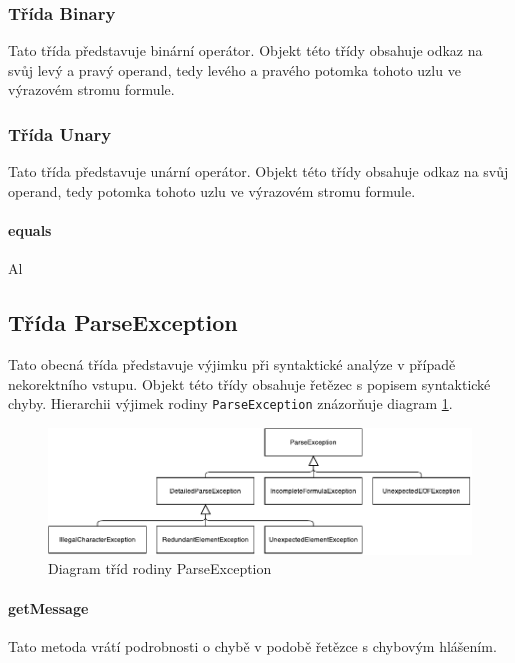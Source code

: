 \documentclass[thesis=B,czech,hidelinks]{thesis}[2012/06/26]
\begin{document}
\subsubsection{Třída Binary}

Tato třída představuje binární operátor. Objekt této třídy obsahuje odkaz na svůj levý a pravý operand, tedy levého a pravého potomka tohoto uzlu ve výrazovém stromu formule.

\subsubsection{Třída Unary}

Tato třída představuje unární operátor. Objekt této třídy obsahuje odkaz na svůj operand, tedy potomka tohoto uzlu ve výrazovém stromu formule.

\paragraph{equals}

Al

\subsection{Třída ParseException}

Tato obecná třída představuje výjimku při syntaktické analýze v případě nekorektního vstupu. Objekt této třídy obsahuje řetězec s popisem syntaktické chyby. Hierarchii výjimek rodiny \texttt{ParseException} znázorňuje diagram \ref{fig:parse_exception}.

\begin{figure}
\centering
\caption{Diagram tříd rodiny ParseException}
\label{fig:parse_exception}
\includegraphics[width=\linewidth]{diagrams/parse_exception}
\end{figure}

\paragraph{getMessage}

Tato metoda vrátí podrobnosti o chybě v podobě řetězce s chybovým hlášením.
\end{document}
